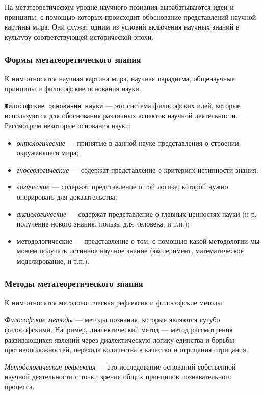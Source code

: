 На метатеоретическом уровне научного познания вырабатываются идеи и принципы, 
с помощью которых происходит обоснование представлений научной картины мира. 
Они служат одним из условий включения научных знаний в культуру соответствующей 
исторической эпохи. 

\subsubsection{Формы метатеоретического знания}

К ним относятся научная картина мира, научная парадигма, общенаучные принципы и философские основания науки.

\texttt{Философские основания науки} --- это
система философских идей, которые используются для обоснования различных
аспектов научной деятельности. Рассмотрим некоторые основания науки:

\begin{itemize}
    \item \textit{онтологические} --- принятые в данной науке представления о строении окружающего мира;
    \item \textit{гносеологические} --- содержат представление о критериях истинности знания;
    \item \textit{логические} --- содержат представление о той логике, которой нужно оперировать для доказательства;
    \item \textit{аксиологические} --- содержат представление о главных ценностях науки (н-р, получение нового знания, пользы для человека, и т.п.);
    \item {методологические} --- представление о том, с помощью какой методологии мы можем получать истинное научное знание (эксперимент, математическое моделирование, и т.п.).
\end{itemize}

\subsubsection{Методы метатеоретического знания}

К ним относятся методологическая рефлексия и философские методы.

\textit{Философские методы} --- методы познания, которые являются сугубо философскими. 
Например, диалектический метод --- метод рассмотрения
развивающихся явлений через диалектическую логику единства и борьбы
противоположностей, перехода количества в качество и отрицания отрицания.

\textit{Методологическая рефлексия} --- это исследование оснований собственной научной
деятельности с точки зрения общих принципов познавательного процесса. 